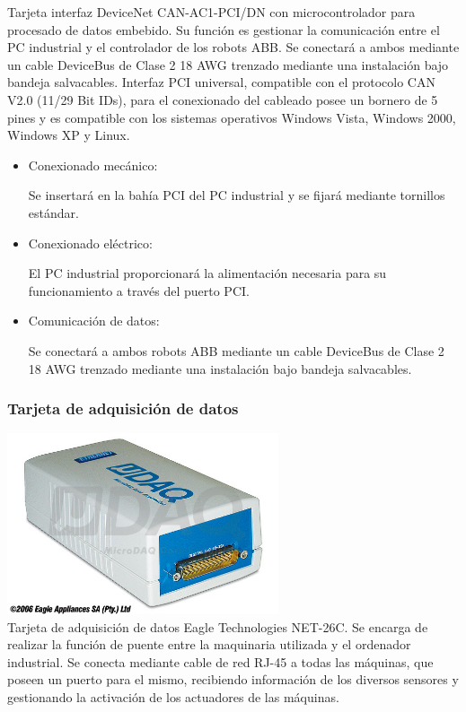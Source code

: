 		Tarjeta interfaz DeviceNet CAN-AC1-PCI/DN con microcontrolador para procesado de datos embebido. Su función es gestionar la comunicación entre el PC industrial y el controlador de los robots ABB. Se conectará a ambos mediante un cable DeviceBus de Clase 2 18 AWG trenzado mediante una instalación bajo bandeja salvacables. Interfaz PCI universal, compatible con el protocolo CAN V2.0 (11/29 Bit IDs), para el conexionado del cableado posee un bornero de 5 pines y es  compatible con los sistemas operativos Windows Vista, Windows 2000, Windows XP y Linux.\\

		\begin{itemize}
				\item{Conexionado mecánico:}
				
				Se insertará en la bahía PCI del PC industrial y se fijará mediante tornillos estándar.

				\item{Conexionado eléctrico:}

				El PC industrial proporcionará la alimentación necesaria para su funcionamiento a través del puerto PCI.
 				
				\item{Comunicación de datos:}
				
				Se conectará a ambos robots ABB mediante un cable DeviceBus de Clase 2 18 AWG trenzado mediante una instalación bajo bandeja salvacables.

		\end{itemize}

\newpage


	\subsubsection{Tarjeta de adquisición de datos}

	\includegraphics[width=0.6\textwidth]{Datasheets/10Foto.jpg}\\

		Tarjeta de adquisición de datos Eagle Technologies NET-26C. Se encarga de realizar la función de puente entre la maquinaria utilizada y el ordenador industrial. Se conecta mediante cable de red RJ-45 a todas las máquinas, que poseen un puerto para el mismo, recibiendo información de los diversos sensores y gestionando la activación de los actuadores de las máquinas.\\

